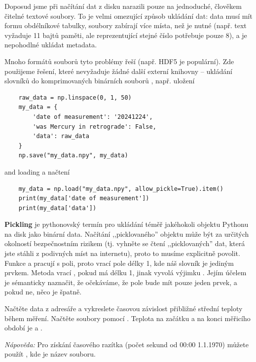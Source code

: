 \begin{syntax}
    \label{syn:npy}
    Doposud jsme při načítání dat z disku narazili pouze na jednoduché, člověkem čitelné textové soubory. To je velmi omezující způsob ukládání dat: data musí mít formu obdélníkové tabulky, soubory zabírají více místa, než je nutné (např. text  vyžaduje 11 bajtů paměti, ale  reprezentující stejné číslo potřebuje pouze 8), a je nepohodlné ukládat metadata.

    Mnoho formátů souborů tyto problémy řeší (např. HDF5 je populární). Zde použijeme řešení, které nevyžaduje žádné další externí knihovny -- ukládání slovníků do komprimovaných binárních souborů , např. uložení
\begin{lstlisting}
    raw_data = np.linspace(0, 1, 50)
    my_data = {
        'date of measurement': '20241224',
        'was Mercury in retrograde': False,
        'data': raw_data
    }
    np.save("my_data.npy", my_data)
\end{lstlisting}
    and loading
    a načtení
\begin{lstlisting}
    my_data = np.load("my_data.npy", allow_pickle=True).item()
    print(my_data['date of measurement'])
    print(my_data['data'])
\end{lstlisting}

    \textbf{Pickling} je pythonovský termín pro ukládání téměř jakéhokoli objektu Pythonu na disk jako binární data. Načítání ,,picklovaného'' objektu může být za určitých okolností bezpečnostním rizikem (tj. vyhněte se čtení ,,picklovaných'' dat, která jste stáhli z podivných míst na internetu), proto to musíme explicitně povolit. Funkce  a  pracují s poli, proto  vrací pole délky 1, kde náš slovník je jediným prvkem. Metoda  vrací , pokud má  délku 1, jinak vyvolá výjimku . Jejím účelem je sémanticky naznačit, že očekáváme, že pole bude mít pouze jeden prvek, a pokud ne, něco je špatně.
    
    \begin{exercise}
    Načtěte data z adresáře  a vykreslete časovou závislost přibližné střední teploty během měření. Načtěte soubory pomocí . Teplota na začátku a na konci měřicího období je  a .
    
    \emph{Nápověda:} Pro získání časového razítka (počet sekund od 00:00 1.1.1970) můžete použít , kde  je název souboru.
\end{exercise}
\end{syntax}

